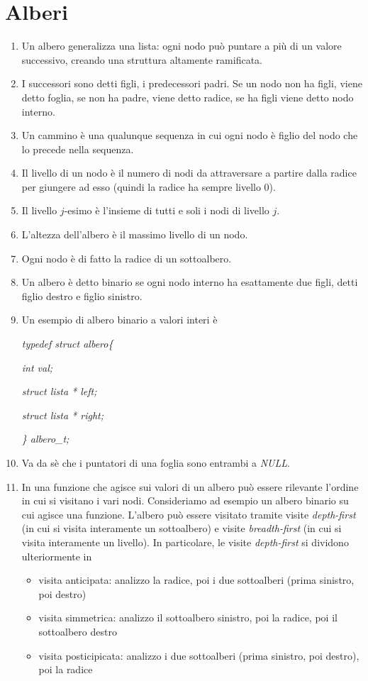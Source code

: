 \documentclass[a4paper,11pt]{article}
\begin{document}
\section{Alberi}
\begin{enumerate}[resume]
	\item Un albero generalizza una lista: ogni nodo può puntare a più di un valore successivo, creando una struttura altamente ramificata.
	\item I successori sono detti figli, i predecessori padri. Se un nodo non ha figli, viene detto foglia, se non ha padre, viene detto radice, se ha figli viene detto nodo interno.
	\item Un cammino è una qualunque sequenza in cui ogni nodo è figlio del nodo che lo precede nella sequenza.
	\item Il livello di un nodo è il numero di nodi da attraversare a partire dalla radice per giungere ad esso (quindi la radice ha sempre livello 0).
	\item Il livello $j$-esimo è l'insieme di tutti e soli i nodi di livello $j$.
	\item L'altezza dell'albero è il massimo livello di un nodo.
	\item Ogni nodo è di fatto la radice di un sottoalbero.
	\item Un albero è detto binario se ogni nodo interno ha esattamente due figli, detti figlio destro e figlio sinistro.
	\item Un esempio di albero binario a valori interi è
	
	\noindent\textit{typedef struct albero\{}
	
	\noindent \textit{int val;}
	
	\noindent \textit{struct lista * left;}
	
	\noindent \textit{struct lista * right;}
	
	\noindent \textit{\} albero\_t;}
	\item Va da sè che i puntatori di una foglia sono entrambi a \textit{NULL}.
	\item In una funzione che agisce sui valori di un albero può essere rilevante l'ordine in cui si visitano i vari nodi. Consideriamo ad esempio un albero binario su cui agisce una funzione. L'albero può essere visitato tramite visite \textit{depth-first} (in cui si visita interamente un sottoalbero) e visite \textit{breadth-first} (in cui si visita interamente un livello). In particolare, le visite \textit{depth-first} si dividono ulteriormente in
	\begin{itemize}
		\item visita anticipata: analizzo la radice, poi i due sottoalberi (prima sinistro, poi destro)
		\item visita simmetrica: analizzo il sottoalbero sinistro, poi la radice, poi il sottoalbero destro
		\item visita posticipicata: analizzo i due sottoalberi (prima sinistro, poi destro), poi la radice
	\end{itemize} 
\end{enumerate}
\end{document}
